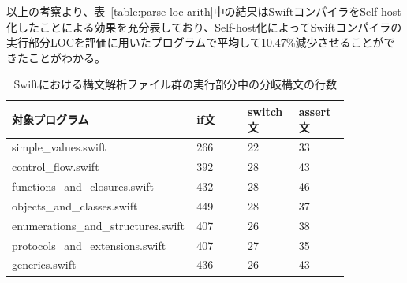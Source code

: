 以上の考察より、表~\ref{table:parse-loc-arith}中の結果はSwiftコンパイラをSelf-host化したことによる効果を充分表しており、Self-host化によってSwiftコンパイラの実行部分LOCを評価に用いたプログラムで平均して10.47\%減少させることができたことがわかる。

\begin{table}[!hbtp]
    \begin{center}
        \caption{Swiftにおける構文解析ファイル群の実行部分中の分岐構文の行数}
        \begin{tabular}{|p{0.4\linewidth}|p{0.15\linewidth}|p{0.15\linewidth}|p{0.15\linewidth}|}
            \hline
            対象プログラム & if文 & switch文 & assert文\\
            \hline
            \hline
            simple\_values.swift & 266 & 22 & 33\\
            \hline
            control\_flow.swift & 392 & 28 & 43\\
            \hline
            functions\_and\_closures.swift & 432 & 28 & 46\\
            \hline
            objects\_and\_classes.swift & 449 & 28 & 37\\
            \hline
            enumerations\_and\_structures.swift & 407 & 26 & 38\\
            \hline
            protocols\_and\_extensions.swift & 407 & 27 & 35\\
            \hline
            generics.swift & 436 & 26 & 43\\
            \hline
        \end{tabular}
        \label{table:branching-method-swift}
    \end{center}
\end{table}


